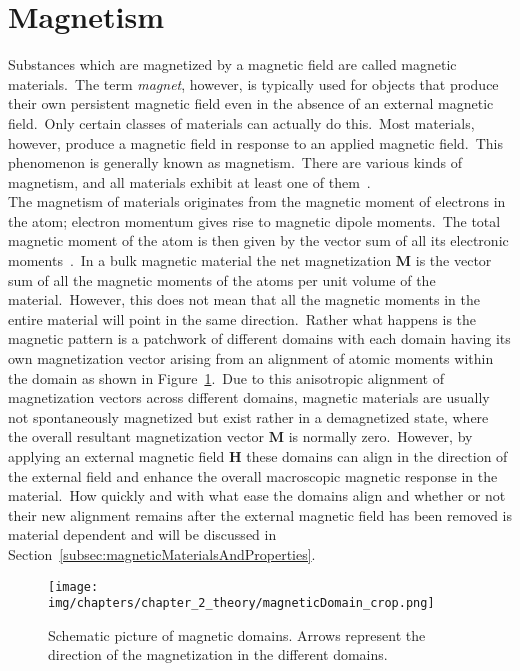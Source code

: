 \section{Magnetism}\label{sec:magnetism}
Substances which are magnetized by a magnetic field are called magnetic materials.\ The term \textit{magnet}, however, is typically used for objects that produce their own persistent magnetic field even in the absence of an external magnetic field.\ Only certain classes of materials can actually do this.\ Most materials, however, produce a magnetic field in response to an applied magnetic field.\ This phenomenon is generally known as magnetism.\ There are various kinds of magnetism, and all materials exhibit at least one of them~\cite{Coey2010}.\\
The magnetism of materials originates from the magnetic moment of electrons in the atom; electron momentum gives rise to magnetic dipole moments.\ The total magnetic moment of the atom is then given by the vector sum of all its electronic moments~\cite{Cullity2011}.\ In a bulk magnetic material the net magnetization $\mathbf{M}$ is the vector sum of all the magnetic moments of the atoms per unit volume of the material.\ However, this does not mean that all the magnetic moments in the entire material will point in the same direction.\ Rather what happens is the magnetic pattern is a patchwork of different domains with each domain having its own magnetization vector arising from an alignment of atomic moments within the domain as shown in Figure~\ref{fig:magneticDomain}.\ Due to this anisotropic alignment of magnetization vectors across different domains, magnetic materials are usually not spontaneously magnetized but exist rather in a demagnetized state, where the overall resultant magnetization vector $\mathbf{M}$ is normally zero.\ However, by applying an external magnetic field $\mathbf{H}$ these domains can align in the direction of the external field and enhance the overall macroscopic magnetic response in the material.\ How quickly and with what ease the domains align and whether or not their new alignment remains after the external magnetic field has been removed is material dependent and will be discussed in Section~\ref{subsec:magneticMaterialsAndProperties}.\
\begin{figure}[htb]
\centering
\texttt{[image: img/chapters/chapter\_2\_theory/magneticDomain\_crop.png]}
\caption[Magnetic domains in magnetic materials]{Schematic picture of magnetic domains. Arrows represent the direction of the magnetization in the different domains.}%
\label{fig:magneticDomain}
\end{figure}
%
